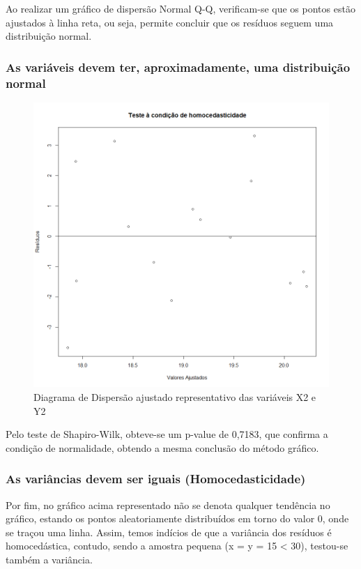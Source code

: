 \documentclass[conference]{IEEEtran}
\begin{document}
Ao realizar um gráfico de dispersão Normal Q-Q, verificam-se que os pontos estão ajustados à linha reta, ou seja, permite concluir que os resíduos seguem uma distribuição normal.

\subsubsection{As variáveis devem ter, aproximadamente, uma distribuição normal}

\begin{figure}[htbp]
\centerline{\includegraphics[width=0.95\columnwidth]{images/03.b.4.png}}
\caption{Diagrama de Dispersão ajustado representativo das variáveis X2 e Y2}
\label{fig}
\end{figure}

Pelo teste de Shapiro-Wilk, obteve-se um p-value de 0,7183, que confirma a condição de normalidade, obtendo a mesma conclusão do método gráfico.

\subsubsection{As variâncias devem ser iguais (Homocedasticidade)}

Por fim, no gráfico acima representado não se denota qualquer tendência no gráfico, estando os pontos aleatoriamente distribuídos em torno do valor 0, onde se traçou uma linha. Assim, temos indícios de que a variância dos resíduos é homocedástica, contudo, sendo a amostra pequena (x = y = 15 < 30), testou-se também a variância.
\end{document}
